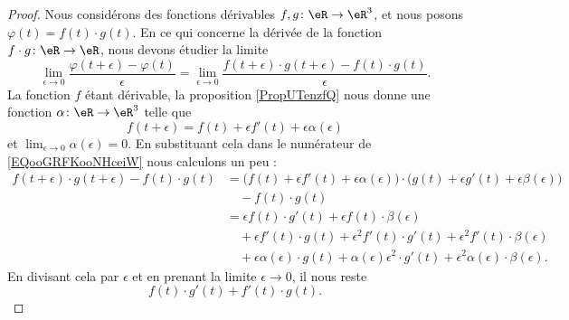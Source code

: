 \begin{proof}
	Nous considérons des fonctions dérivables \( f,g\colon \eR\to \eR^3\), et nous posons \( \varphi(t)=f(t)\cdot g(t)\). En ce qui concerne la dérivée de la fonction \( f\cdot g\colon \eR\to \eR\), nous devons étudier la limite
	\begin{equation}        \label{EQooGRFKooNHceiW}
		\lim_{\epsilon\to 0}\frac{ \varphi(t+\epsilon)-\varphi(t) }{ \epsilon }=\lim_{\epsilon\to 0}\frac{ f(t+\epsilon)\cdot g(t+\epsilon)-f(t)\cdot g(t) }{ \epsilon }.
	\end{equation}
	La fonction \( f\) étant dérivable, la proposition \ref{PropUTenzfQ} nous donne une fonction \( \alpha\colon \eR\to \eR^3\) telle que
	\begin{equation}
		f(t+\epsilon)=f(t)+\epsilon f'(t)+\epsilon\alpha(\epsilon)
	\end{equation}
	et \( \lim_{\epsilon\to 0}\alpha(\epsilon)=0\). En substituant cela dans le numérateur de \eqref{EQooGRFKooNHceiW} nous calculons un peu :
	\begin{subequations}        \label{SUBEQSooMNAZooQjGGpg}
		\begin{align}
			f(t+\epsilon)\cdot g(t+\epsilon)-f(t)\cdot g(t) & =\big( f(t)+\epsilon f'(t)+\epsilon \alpha(\epsilon) \big)\cdot\big( g(t)+\epsilon g'(t)+\epsilon\beta(\epsilon) \big)          \\
			                                                & \quad - f(t)\cdot g(t)                                                                                                          \\
			                                                & =\epsilon f(t)\cdot g'(t)+\epsilon f(t)\cdot \beta(\epsilon)                                                                    \\
			                                                & \quad +\epsilon f'(t)\cdot g(t) + \epsilon^2 f'(t)\cdot g'(t)+\epsilon^2 f'(t)\cdot \beta(\epsilon)                             \\
			                                                & \quad+\epsilon\alpha(\epsilon)\cdot g(t)+\alpha(\epsilon)\epsilon^2\cdot g'(t)+\epsilon^2\alpha(\epsilon)\cdot \beta(\epsilon).
		\end{align}
	\end{subequations}
	En divisant cela par \( \epsilon\) et en prenant la limite \( \epsilon\to 0\), il nous reste
	\begin{equation}
		f(t)\cdot g'(t)+f'(t)\cdot g(t).
	\end{equation}
\end{proof}

